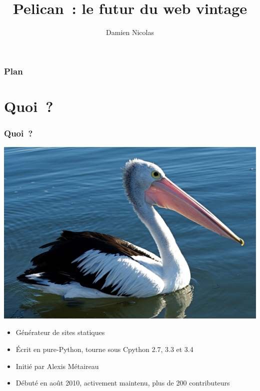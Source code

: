 \documentclass[frenchb,francais]{beamer}
\title[Pelican]{Pelican : le futur du web vintage}
\author {Damien Nicolas}
\begin{document}
\frame{\titlepage}

\begin{frame}
\frametitle{Plan}
\tableofcontents
\end{frame}

\section{Quoi ?}

\begin{frame}
    \frametitle{Quoi ?}
    \begin{center}\includegraphics[scale=.08]{img/pelican.jpg}\end{center}
    \begin{itemize}
        \item Générateur de sites statiques
        \item Écrit en pure-Python, tourne sous Cpython 2.7, 3.3 et 3.4
        \item Initié par Alexis Métaireau
        \item Débuté en août 2010, activement maintenu, plus de 200 contributeurs
    \end{itemize}
\end{frame}
\end{document}
